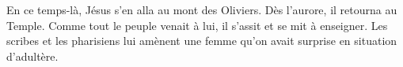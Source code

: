 En ce temps-là, Jésus s’en alla au mont des Oliviers.
Dès l’aurore, il retourna au Temple.
	Comme tout le peuple venait à lui, il s’assit et se mit à enseigner.
Les scribes et les pharisiens lui amènent une femme
	qu’on avait surprise en situation d’adultère.
